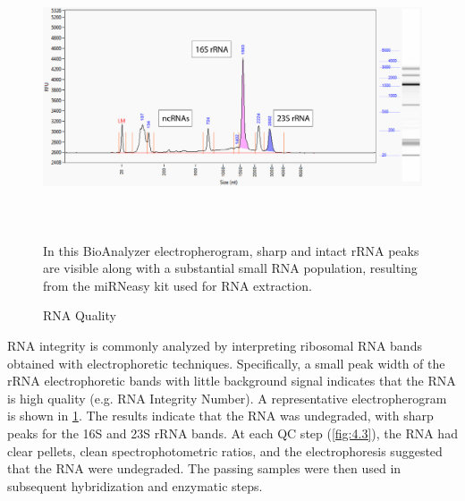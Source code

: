 \begin{figure}
\includegraphics[width=\textwidth,height=3in]{images/Sequencing/RNA-integrity.png}
\caption{RNA Quality}\label{fig:4.2}
In this BioAnalyzer electropherogram, sharp and intact rRNA peaks are visible along with a substantial small RNA population, resulting from the miRNeasy kit used for RNA extraction.
\end{figure}

RNA integrity is commonly analyzed by interpreting ribosomal RNA bands obtained with electrophoretic techniques. Specifically, a small peak width of the rRNA electrophoretic bands with little background signal indicates that the RNA is high quality (e.g. RNA Integrity Number). A representative electropherogram is shown in \ref{fig:4.2}. The results indicate that the RNA was undegraded, with sharp peaks for the 16S and 23S rRNA bands. At each QC step (\ref{fig:4.3}), the RNA had clear pellets, clean spectrophotometric ratios, and the electrophoresis suggested that the RNA were undegraded. The passing samples were then used in subsequent hybridization and enzymatic steps.

